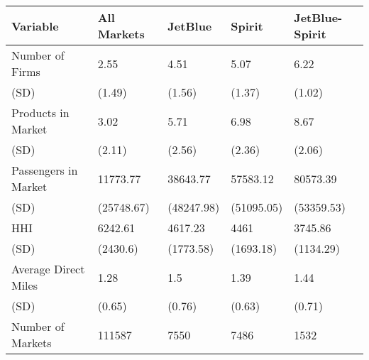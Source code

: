 
\begin{tabular}[t]{lllll}
\toprule
Variable & All Markets & JetBlue & Spirit & JetBlue-Spirit\\
\midrule
Number of Firms & 2.55 & 4.51 & 5.07 & 6.22\\
(SD) & (1.49) & (1.56) & (1.37) & (1.02)\\
Products in Market & 3.02 & 5.71 & 6.98 & 8.67\\
(SD) & (2.11) & (2.56) & (2.36) & (2.06)\\
Passengers in Market & 11773.77 & 38643.77 & 57583.12 & 80573.39\\
(SD) & (25748.67) & (48247.98) & (51095.05) & (53359.53)\\
HHI & 6242.61 & 4617.23 & 4461 & 3745.86\\
(SD) & (2430.6) & (1773.58) & (1693.18) & (1134.29)\\
Average Direct Miles & 1.28 & 1.5 & 1.39 & 1.44\\
(SD) & (0.65) & (0.76) & (0.63) & (0.71)\\
\midrule
Number of Markets & 111587 & 7550 & 7486 & 1532\\
\bottomrule
\end{tabular}
